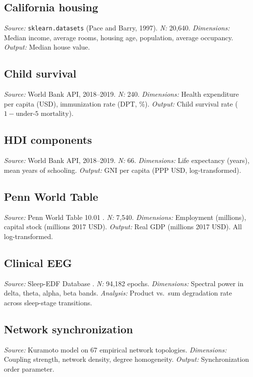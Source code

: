 \documentclass[12pt, a4paper]{article}
\theoremstyle{definition}
\theoremstyle{remark}
\begin{document}
\subsection{California housing}
\textit{Source:} \texttt{sklearn.datasets} (Pace and Barry, 1997). \textit{N:} 20,640. \textit{Dimensions:} Median income, average rooms, housing age, population, average occupancy. \textit{Output:} Median house value.

\subsection{Child survival}
\textit{Source:} World Bank API, 2018--2019. \textit{N:} 240. \textit{Dimensions:} Health expenditure per capita (USD), immunization rate (DPT, \%). \textit{Output:} Child survival rate ($1 - \text{under-5 mortality}$).

\subsection{HDI components}
\textit{Source:} World Bank API, 2018--2019. \textit{N:} 66. \textit{Dimensions:} Life expectancy (years), mean years of schooling. \textit{Output:} GNI per capita (PPP USD, log-transformed).

\subsection{Penn World Table}
\textit{Source:} Penn World Table 10.01 \cite{feenstra2015}. \textit{N:} 7,540. \textit{Dimensions:} Employment (millions), capital stock (millions 2017 USD). \textit{Output:} Real GDP (millions 2017 USD). All log-transformed.

\subsection{Clinical EEG}
\textit{Source:} Sleep-EDF Database \cite{goldberger2000}. \textit{N:} 94,182 epochs. \textit{Dimensions:} Spectral power in delta, theta, alpha, beta bands. \textit{Analysis:} Product vs.\ sum degradation rate across sleep-stage transitions.

\subsection{Network synchronization}
\textit{Source:} Kuramoto model on 67 empirical network topologies. \textit{Dimensions:} Coupling strength, network density, degree homogeneity. \textit{Output:} Synchronization order parameter.
\end{document}
